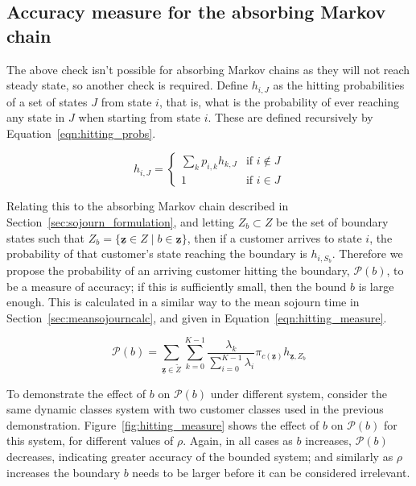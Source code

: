 \documentclass{article}
\begin{document}
\subsection{Accuracy measure for the absorbing Markov chain}\label{sec:absorbing_check}
The above check isn't possible for absorbing Markov chains as they will not
reach steady state, so another check is required. Define $h_{i,J}$ as
the hitting probabilities of a set of states $J$ from state $i$, that is, what
is the probability of ever reaching any state in $J$ when starting from state
$i$. These are defined recursively by Equation~\ref{eqn:hitting_probs}.

\begin{equation}\label{eqn:hitting_probs}
h_{i,J} = \begin{cases}
\sum_k p_{i,k} h_{k,J} & \text{if } i \notin J \\
1 & \text{if } i \in J
\end{cases}
\end{equation}

Relating this to the absorbing Markov chain described in
Section~\ref{sec:sojourn_formulation}, and letting $Z_b \subset Z$ be the set of
boundary states such that
$Z_b = \{\underline{\mathbf{z}} \in Z \; | \; b \in \underline{\mathbf{z}}\}$,
then if a customer arrives to state $i$, the probability of that customer's
state reaching the boundary is $h_{i,S_b}$. Therefore we propose the probability
of an arriving customer hitting the boundary, $\mathcal{P}(b)$, to be a measure
of accuracy; if this is sufficiently small, then the bound $b$ is large enough.
This is calculated in a similar way to the mean sojourn time in
Section~\ref{sec:meansojourncalc}, and given in Equation~\ref{eqn:hitting_measure}.

\begin{equation}\label{eqn:hitting_measure}
\mathcal{P}(b) = \sum_{\underline{\mathbf{z}} \in \tilde{Z}} \sum_{k=0}^{K-1} \frac{\lambda_k}{\sum_{i=0}^{K-1} \lambda_i} \pi_{c(\underline{\mathbf{z}})} h_{\underline{\mathbf{z}}, Z_b}
\end{equation}

To demonstrate the effect of $b$ on $\mathcal{P}(b)$ under different system,
consider the same dynamic classes system with two customer classes used in the
previous demonstration. Figure~\ref{fig:hitting_measure} shows the effect of $b$
on $\mathcal{P}(b)$ for this system, for different values of $\rho$. Again, in
all cases as $b$ increases, $\mathcal{P}(b)$ decreases, indicating greater
accuracy of the bounded system; and similarly as $\rho$ increases the boundary
$b$ needs to be larger before it can be considered irrelevant.
\end{document}
